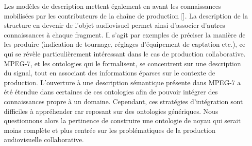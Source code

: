 Les modèles de description  mettent également en avant les connaissances mobilisées par les contributeurs de la chaîne de production [].
La description de la structure en devenir de l'objet audiovisuel permet ainsi d'associer d'autres connaissances à chaque fragment. Il s'agit par exemples de préciser la manière de les produire (indication de tournage, réglages d'équipement de captation etc.), ce qui se révèle particulièrement intéressant dans le cas de production collaborative.
MPEG-7, et les ontologies qui le formalisent, se concentrent sur une description du signal, tout en associant des informations éparses sur le contexte de production.
L'ouverture à une description sémantique présente dans MPEG-7 a été étendue dans certaines de ces ontologies afin de pouvoir intégrer des connaissances propre à un domaine.
Cependant, ces stratégies d'intégration sont difficiles à appréhender car reposant sur des ontologies génériques. 
Nous questionnons alors la pertinence de construire une ontologie de noyau qui serait moins complète et plus centrée sur les problématiques de la production audiovisuelle collaborative.







